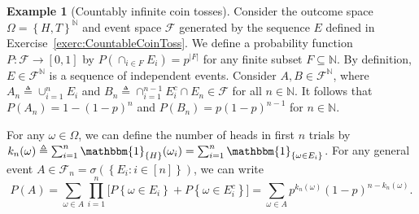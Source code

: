 \documentclass[letterpaper,10pt,english]{article}
\theoremstyle{plain}
\theoremstyle{definition}
\newtheorem{exmp}[thm]{Example}
\theoremstyle{remark}
\newcommand{\EQ}[1]{\begin{equation*}#1\end{equation*}}
\newcommand{\abs}[1]{\left\lvert#1\right\rvert}
\newcommand{\set}[1]{\left\{#1\right\}}
\newcommand{\SetIn}[1]{\mathbbm{1}_{\set{#1}}}
\newcommand{\N}{\mathbb{N}}
\newcommand{\sF}{\mathscr{F}}
\begin{document}
\begin{shaded}
\begin{exmp}[Countably infinite coin tosses] 
Consider the outcome space $\Omega = \set{H,T}^\N$ and event space $\sF$ generated by the sequence $E$ defined in Exercise~\ref{exerc:CountableCoinToss}.  
We define a probability function $P:\sF \to [0,1]$ by $P(\cap_{i\in F}E_i)= p^{\abs{F}}$ for any finite subset $F \subseteq \N$.  
By definition, $E \in \sF^\N$ is a sequence of independent events. 
Consider $A, B \in \sF^\N$, 
where $A_n \triangleq \cup_{i=1}^nE_i$ and $B_n \triangleq \cap_{i=1}^{n-1}E_i^c\cap E_n \in \sF$ for all $n\in\N$.
It follows that $P(A_n) = 1-(1-p)^n$ and $P(B_n) = p(1-p)^{n-1}$ for $n \in \N$. 

For any $\omega \in \Omega$, we can define the number of heads in first $n$ trials by $k_n(\omega) \triangleq\sum_{i=1}^n\SetIn{H}(\omega_i) = \sum_{i=1}^n\SetIn{\omega \in E_i}$. 
For any general event $A \in \sF_n = \sigma(\set{E_i: i \in [n]})$, we can write 
\EQ{
P(A) = \sum_{\omega \in A} \prod_{i=1}^n\Big[P\set{\omega \in E_i}  + P\set{\omega \in E_i^c}\Big] 
= \sum_{\omega \in A}p^{k_n(\omega)}(1-p)^{n-k_n(\omega)}.
}  
\end{exmp}
\end{shaded}
\end{document}
